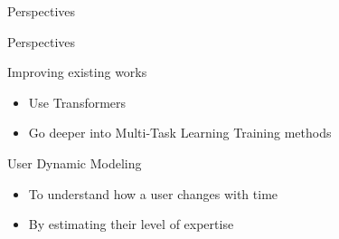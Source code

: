 \begin{section}{Perspectives}
    \begin{frame}{Perspectives}
    \begin{block}{Improving existing works}
        \begin{itemize}
            \item Use Transformers
            \item Go deeper into Multi-Task Learning Training methods
        \end{itemize}
    \end{block}
    \begin{block}{User Dynamic Modeling}
        \begin{itemize}
            \item To understand how a user changes with time
            \item By estimating their level of expertise
        \end{itemize}
    \end{block}
    \end{frame}
\end{section}